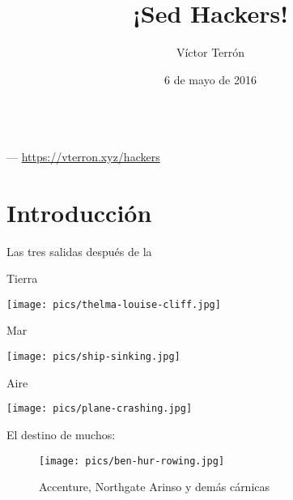\documentclass[14pt]{beamer}
\title{¡Sed Hackers!}
\author{Víctor Terrón}
\date{6 de mayo de 2016}
\institute{@pyctor}
\begin{document}
{

\begin{frame}[plain]
  \vspace{6.25cm}
  \begin{TitleBox}
    {\LARGE \inserttitle} \\
    {\small \insertauthor \enspace --- \thinspace \url{https://vterron.xyz/hackers}}
  \end{TitleBox}
\end{frame}
}

\section{Introducción}
\begin{frame}{}
\begin{block}{}
    \centering \Large Las tres salidas después de la 
\end{block}
\end{frame}

\begin{frame}{Tierra}
  \begin{center}
    \texttt{[image: pics/thelma-louise-cliff.jpg]}
  \end{center}
\end{frame}

\begin{frame}{Mar}
  \begin{center}
    \texttt{[image: pics/ship-sinking.jpg]}
  \end{center}
\end{frame}

\begin{frame}{Aire}
  \begin{center}
    \texttt{[image: pics/plane-crashing.jpg]}
  \end{center}
\end{frame}

\begin{frame}{}
\begin{block}{}
    \centering \Large El destino de muchos: 
\end{block}
\begin{figure}
  \centering
  \texttt{[image: pics/ben-hur-rowing.jpg]}
  \caption*{Accenture, Northgate Arinso y demás cárnicas}
\end{figure}
\end{frame}
\end{document}
